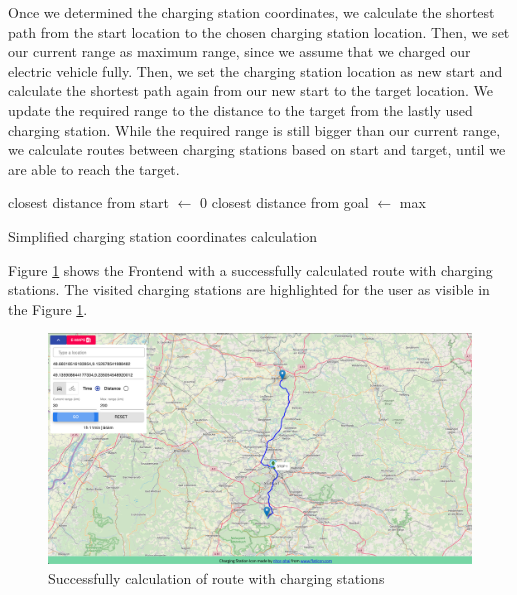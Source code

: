 \documentclass[a4paper]{article}
\begin{document}
Once we determined the charging station coordinates, we calculate the shortest path from the start location to the chosen charging station location.
Then, we set our current range as maximum range, since we assume that we charged our electric vehicle fully.
Then, we set the charging station location as new start and calculate the shortest path again from our new start to the target location.
We update the required range to the distance to the target from the lastly used charging station.
While the required range is still bigger than our current range, we calculate routes between charging stations based on start and target, until we are able to reach the target.
\par\bigskip
\begin{algorithm}[H]
closest distance from start $\leftarrow$ 0\;
closest distance from goal $\leftarrow$ max\;
 \caption{Simplified charging station coordinates calculation}
 \label{alg:charg}
\end{algorithm}\par\bigskip
Figure \ref{fig:success} shows the Frontend with a successfully calculated route with charging stations.
The visited charging stations are highlighted for the user as visible in the Figure \ref{fig:success}. \\
\begin{figure}[h]
    \centering
    \includegraphics[scale=0.25]{figures/success}
    \caption{Successfully calculation of route with charging stations}
    \label{fig:success}
\end{figure}
\end{document}

